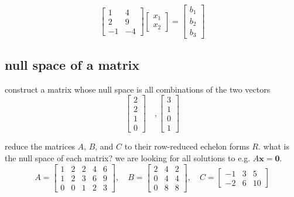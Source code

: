 \documentclass[addpoints]{exam}
\begin{document}
\begin{questions}
\begin{equation*}
	\begin{bmatrix} 1 & 4 \\ 2 & 9 \\ -1 &  -4 \end{bmatrix} 
	\begin{bmatrix} x_1 \\x_2 \end{bmatrix} = \begin{bmatrix} b_1 \\b_2\\b_3\end{bmatrix}
\end{equation*} 

\subsection*{null space of a matrix}
\question construct a matrix whose null space is all combinations of the two vectors
\begin{equation*}
	\begin{bmatrix} 2 \\ 2 \\ 1 \\ 0 \end{bmatrix} \quad, \begin{bmatrix}3 \\ 1  \\ 0 \\ 1 \end{bmatrix} 
\end{equation*} 

\question reduce the matrices $A$, $B$, and $C$ to their row-reduced echelon forms $R$. what is the null space of each matrix? we are looking for all solutions to e.g. $A\mathbf{x}=\mathbf{0}$.
\begin{equation*}
	A=\begin{bmatrix} 1 & 2 & 2 & 4 & 6\\1 &2&3&6&9 \\ 0&0&1&2&3\end{bmatrix} ,\quad B=\begin{bmatrix}2 & 4 & 2 \\ 0&4&4\\ 0&8&8 \end{bmatrix} , \quad C= \begin{bmatrix}-1& 3 & 5 \\ -2&6&10\end{bmatrix} 
\end{equation*} 


\end{questions}
\end{document}
